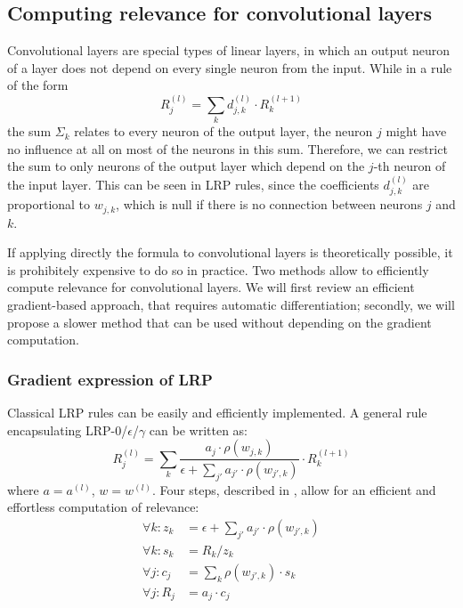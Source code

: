 \documentclass{../cs-classes/cs-classes}
\newcommand*{\1}{\digitsbb{1}}
\newcommand*{\0}{\digitsbb{0}}
\begin{document}
\subsection{Computing relevance for convolutional layers}
Convolutional layers are special types of linear layers, in which an output neuron of a layer does not depend on every single neuron from the input. While in a rule of the form
\begin{equation*}
    R_j^{(l)} = \sum_k d_{j, k}^{(l)} \cdot R_k^{(l+1)}
\end{equation*}
the sum $\Sigma_k$ relates to every neuron of the output layer, the neuron $j$ might have no influence at all on most of the neurons in this sum. Therefore, we can restrict the sum to only neurons of the output layer which depend on the $j$-th neuron of the input layer. This can be seen in LRP rules, since the coefficients $d_{j, k}^{(l)}$ are proportional to $w_{j,k}$, which is null if there is no connection between neurons $j$ and $k$. 

If applying directly the formula to convolutional layers is theoretically possible, it is prohibitely expensive to do so in practice. Two methods allow to efficiently compute relevance for convolutional layers. We will first review an efficient gradient-based approach, that requires automatic differentiation; secondly, we will propose a slower method that can be used without depending on the gradient computation.

\subsubsection{Gradient expression of LRP}
Classical LRP rules can be easily and efficiently implemented. A general rule encapsulating LRP-0/$\epsilon$/$\gamma$ can be written as:
\begin{equation}
    R_j^{(l)} = \sum_k\frac{a_j\cdot\rho(w_{j,k})}{\epsilon+\sum_{j'}a_{j'}\cdot{\rho(w_{j',k})}} \cdot R_k^{(l+1)}
\end{equation}
where $a=a^{(l)}$, $w=w^{(l)}$. Four steps, described in \cite{montavon-lrp}, allow for an efficient and effortless computation of relevance:
\begin{equation}
    \begin{aligned}
        \textstyle\forall k: z_k &= \epsilon + \sum\nolimits_{j'}a_{j'}\cdot\rho(w_{j',k})\\
        \forall k: s_k &= R_k / z_k\\
        \forall j: c_j &= \sum\nolimits_k\rho(w_{j',k})\cdot s_k\\
        \forall j: \!R_j &= a_j\cdot c_j
    \end{aligned}
\end{equation}
\end{document}
